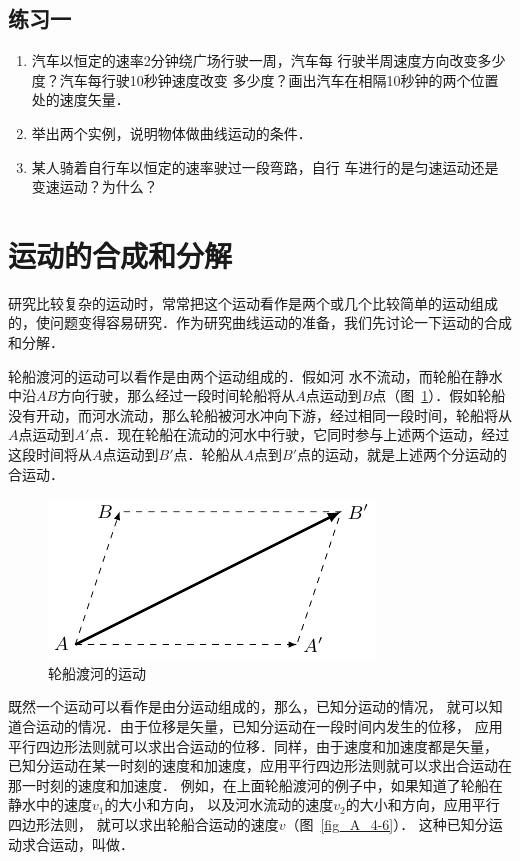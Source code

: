 \subsection*{练习一}
\begin{enumerate}
\item 汽车以恒定的速率2分钟绕广场行驶一周，汽车每
行驶半周速度方向改变多少度？汽车每行驶10秒钟速度改变
多少度？画出汽车在相隔10秒钟的两个位置处的速度矢量．
\item 举出两个实例，说明物体做曲线运动的条件．
\item 某人骑着自行车以恒定的速率驶过一段弯路，自行
车进行的是匀速运动还是变速运动？为什么？
\end{enumerate}


\section{运动的合成和分解}
研究比较复杂的运动时，常常把这个运动看作是两个或几个比较简单的运动组成的，使问题变得容易研究．作为研究曲线运动的准备，我们先讨论一下运动的合成和分解．

轮船渡河的运动可以看作是由两个运动组成的．假如河
水不流动，而轮船在静水中沿$AB$方向行驶，那么经过一段时间轮船将从$A$点运动到$B$点（图~\ref{fig_A_4-5}）．假如轮船没有开动，而河水流动，那么轮船被河水冲向下游，经过相同一段时间，轮船将从$A$点运动到$A'$点．现在轮船在流动的河水中行驶，它同时参与上述两个运动，经过这段时间将从$A$点运动到$B'$点．轮船从$A$点到$B'$点的运动，就是上述两个分运动的合运动．

\begin{figure}[htbp]
    \centering
    \includegraphics{fig/A/4-5.pdf}
    \caption{轮船渡河的运动}\label{fig_A_4-5}
\end{figure}

既然一个运动可以看作是由分运动组成的，那么，已知分运动的情况，
就可以知道合运动的情况．由于位移是矢量，已知分运动在一段时间内发生的位移，
应用平行四边形法则就可以求出合运动的位移．同样，由于速度和加速度都是矢量，
已知分运动在某一时刻的速度和加速度，应用平行四边形法则就可以求出合运动在那一时刻的速度和加速度．
例如，在上面轮船渡河的例子中，如果知道了轮船在静水中的速度$v_1$的大小和方向，
以及河水流动的速度$v_2$的大小和方向，应用平行四边形法则，
就可以求出轮船合运动的速度$v$（图~\ref{fig_A_4-6}）．
这种已知分运动求合运动，叫做．

